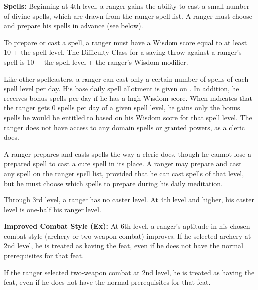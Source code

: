 
\textbf{Spells:} Beginning at 4th level, a ranger gains the ability to cast a small number of divine spells, which are drawn from the ranger spell list. A ranger must choose and prepare his spells in advance (see below).

To prepare or cast a spell, a ranger must have a Wisdom score equal to at least 10 + the spell level. The Difficulty Class for a saving throw against a ranger's spell is 10 + the spell level + the ranger's Wisdom modifier.

Like other spellcasters, a ranger can cast only a certain number of spells of each spell level per day. His base daily spell allotment is given on . In addition, he receives bonus spells per day if he has a high Wisdom score. When  indicates that the ranger gets 0 spells per day of a given spell level, he gains only the bonus spells he would be entitled to based on his Wisdom score for that spell level. The ranger does not have access to any domain spells or granted powers, as a cleric does.

A ranger prepares and casts spells the way a cleric does, though he cannot lose a prepared spell to cast a cure spell in its place. A ranger may prepare and cast any spell on the ranger spell list, provided that he can cast spells of that level, but he must choose which spells to prepare during his daily meditation.

Through 3rd level, a ranger has no caster level. At 4th level and higher, his caster level is one-half his ranger level.

\textbf{Improved Combat Style (Ex):} At 6th level, a ranger's aptitude in his chosen combat style (archery or two-weapon combat) improves. If he selected archery at 2nd level, he is treated as having the  feat, even if he does not have the normal prerequisites for that feat.

If the ranger selected two-weapon combat at 2nd level, he is treated as having the  feat, even if he does not have the normal prerequisites for that feat.

